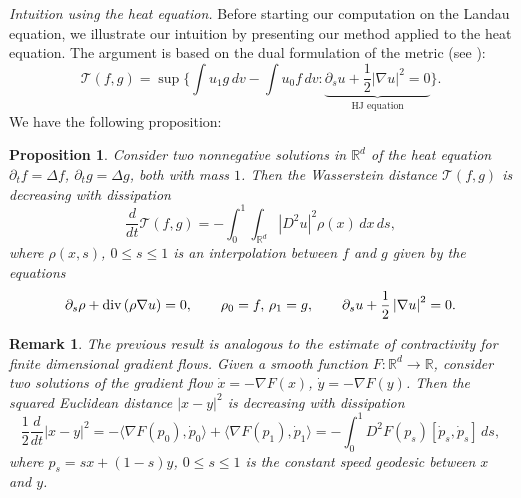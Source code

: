 \documentclass[11pt]{amsart}
\numberwithin{equation}{section}
\newtheorem*{proposition*}{Proposition}
\newtheorem{remark}{Remark}
\begin{document}
{\em{Intuition using the heat equation.}}  Before starting our computation on the Landau equation, we illustrate our intuition by presenting our method applied to the heat equation. The argument is based on the dual formulation of the metric  (see \cite{gigli2020benamou}):
% 
\begin{equation}\label{eq:bhj_formulation}
  \mathcal{T}(f,g)= 
  \sup\Big\{ 
    \int u_1g\,dv-\int u_0f \,dv:\underbrace{\partial_{s}u+\frac{1}{2}\left|\nabla u\right|^{2} =0}_{\text{HJ equation}}
    \Big\}.
\end{equation}
We have the following proposition: 
\begin{proposition*}
  Consider two nonnegative solutions in $\mathbb{R}^d$ of the heat equation $\partial_t f = \Delta f$, $\partial_t g = \Delta g$, both with mass $1$. Then the Wasserstein distance $\mathcal T(f,g)$ is decreasing with dissipation
  \begin{equation*}
    \frac{d}{dt}\mathcal T(f,g) = -\int_0^1\int_{\mathbb{R}^d}\left|D^2u\right|^2\rho(x)\,dx\,ds,
  \end{equation*}
  where $\rho(x,s)$, $0\leq s\leq 1$ is an interpolation between $f$ and $g$ given by the equations
  \begin{equation}\label{eq:CE_heat}
    \partial_{s}\rho+\textnormal{div}\left(\rho\nabla u\right)=0,\qquad\rho_{0}=f,\,\rho_{1}=g,\qquad\partial_{s}u+\frac{1}{2}\left|\nabla u\right|^{2}=0.
  \end{equation}
\end{proposition*}
% 
\begin{remark}
  The previous result is analogous to the estimate of contractivity for finite dimensional gradient flows. Given a smooth function $F:\mathbb{R}^d\to\mathbb{R}$, consider two solutions of the gradient flow $\dot x = -\nabla F(x)$, $\dot y = -\nabla F(y)$. Then the squared Euclidean distance $|x-y|^2$ is decreasing with dissipation
  $$
  \frac{1}{2}\frac{d}{dt}|x-y|^2=- \langle\nabla F(p_0),\dot{p}_0\rangle+\langle\nabla F(p_1),\dot{p}_1\rangle = -\int_0^1 D^2F(p_s)[\dot{p}_s,\dot{p}_s]\,ds,
  $$
  where $p_s = sx + (1-s)y$, $0\leq s\leq 1$ is the constant speed geodesic between $x$ and $y$.
\end{remark}
\end{document}
